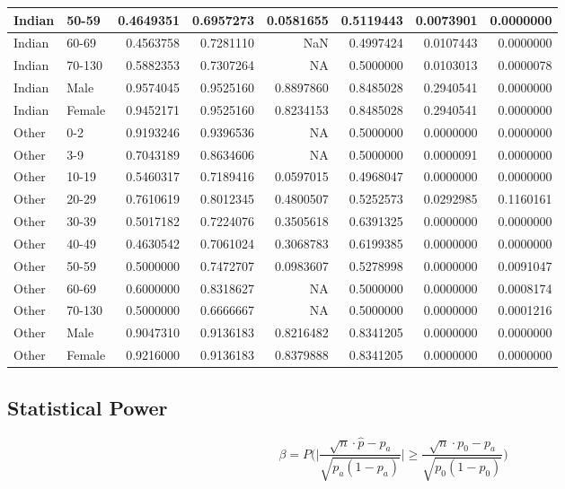 \documentclass[
  letterpaper,
  DIV=11,
  numbers=noendperiod]{scrreprt}
\begin{document}
\begin{tabular}{l|l|r|r|r|r|r|r}
\hline
Indian & 50-59 & 0.4649351 & 0.6957273 & 0.0581655 & 0.5119443 & 0.0073901 & 0.0000000\\
\hline
Indian & 60-69 & 0.4563758 & 0.7281110 & NaN & 0.4997424 & 0.0107443 & 0.0000000\\
\hline
Indian & 70-130 & 0.5882353 & 0.7307264 & NA & 0.5000000 & 0.0103013 & 0.0000078\\
\hline
Indian & Male & 0.9574045 & 0.9525160 & 0.8897860 & 0.8485028 & 0.2940541 & 0.0000000\\
\hline
Indian & Female & 0.9452171 & 0.9525160 & 0.8234153 & 0.8485028 & 0.2940541 & 0.0000000\\
\hline
Other & 0-2 & 0.9193246 & 0.9396536 & NA & 0.5000000 & 0.0000000 & 0.0000000\\
\hline
Other & 3-9 & 0.7043189 & 0.8634606 & NA & 0.5000000 & 0.0000091 & 0.0000000\\
\hline
Other & 10-19 & 0.5460317 & 0.7189416 & 0.0597015 & 0.4968047 & 0.0000000 & 0.0000000\\
\hline
Other & 20-29 & 0.7610619 & 0.8012345 & 0.4800507 & 0.5252573 & 0.0292985 & 0.1160161\\
\hline
Other & 30-39 & 0.5017182 & 0.7224076 & 0.3505618 & 0.6391325 & 0.0000000 & 0.0000000\\
\hline
Other & 40-49 & 0.4630542 & 0.7061024 & 0.3068783 & 0.6199385 & 0.0000000 & 0.0000000\\
\hline
Other & 50-59 & 0.5000000 & 0.7472707 & 0.0983607 & 0.5278998 & 0.0000000 & 0.0091047\\
\hline
Other & 60-69 & 0.6000000 & 0.8318627 & NA & 0.5000000 & 0.0000000 & 0.0008174\\
\hline
Other & 70-130 & 0.5000000 & 0.6666667 & NA & 0.5000000 & 0.0000000 & 0.0001216\\
\hline
Other & Male & 0.9047310 & 0.9136183 & 0.8216482 & 0.8341205 & 0.0000000 & 0.0000000\\
\hline
Other & Female & 0.9216000 & 0.9136183 & 0.8379888 & 0.8341205 & 0.0000000 & 0.0000000\\
\hline
\end{tabular}

\hypertarget{statistical-power}{%
\subsection{Statistical Power}\label{statistical-power}}

\[
\beta = P\bigg(\bigg|\frac{\sqrt{n}\cdot\hat{p}-p_a}{\sqrt{p_a(1-p_a)}}\bigg|\geq\frac{\sqrt{n}\cdot p_0-p_a}{\sqrt{p_0(1-p_0)}}\bigg)
\]
\end{document}

